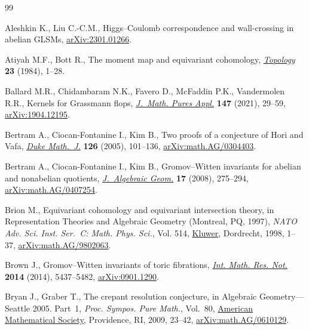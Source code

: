 \documentclass[pdftex]{sigma}
\numberwithin{equation}{section}
\begin{document}
\begin{thebibliography}{99}
\footnotesize\itemsep=0pt

Aleshkin K., Liu C.-C.M., {H}iggs--{C}oulomb correspondence and wall-crossing in
 abelian {GLSM}s, \href{https://arxiv.org/abs/2301.01266}{arXiv:2301.01266}.

Atiyah M.F., Bott R., The moment map and equivariant cohomology,
 \href{https://doi.org/10.1016/0040-9383(84)90021-1}{\textit{Topology}} \textbf{23} (1984), 1--28.

Ballard M.R., Chidambaram N.K., Favero D., McFaddin P.K., Vandermolen R.R.,
 Kernels for {G}rassmann flops, \href{https://doi.org/10.1016/j.matpur.2021.01.005}{\textit{J.~Math. Pures Appl.}} \textbf{147}
 (2021), 29--59, \href{https://arxiv.org/abs/1904.12195}{arXiv:1904.12195}.

Bertram A., Ciocan-Fontanine I., Kim B., Two proofs of a conjecture of {H}ori
 and {V}afa, \href{https://doi.org/10.1215/S0012-7094-04-12613-2}{\textit{Duke Math.~J.}} \textbf{126} (2005), 101--136,
 \href{https://arxiv.org/abs/math.AG/0304403}{arXiv:math.AG/0304403}.

Bertram A., Ciocan-Fontanine I., Kim B., Gromov--{W}itten invariants for
 abelian and nonabelian quotients, \href{https://doi.org/10.1090/S1056-3911-07-00456-0}{\textit{J.~Algebraic Geom.}} \textbf{17}
 (2008), 275--294, \href{https://arxiv.org/abs/math.AG/0407254}{arXiv:math.AG/0407254}.

Brion M., Equivariant cohomology and equivariant intersection theory, in
 Representation Theories and Algebraic Geometry ({M}ontreal, {PQ}, 1997),
 \textit{NATO Adv. Sci. Inst. Ser.~C: Math. Phys. Sci.}, Vol. 514, \href{https://doi.org/10.1007/978-94-015-9131-7_1}{Kluwer},
 Dordrecht, 1998, 1--37, \href{https://arxiv.org/abs/math.AG/9802063}{arXiv:math.AG/9802063}.

Brown J., Gromov--{W}itten invariants of toric fibrations, \href{https://doi.org/10.1093/imrn/rnt030}{\textit{Int. Math.
 Res. Not.}} \textbf{2014} (2014), 5437--5482, \href{https://arxiv.org/abs/0901.1290}{arXiv:0901.1290}.

Bryan J., Graber T., The crepant resolution conjecture, in Algebraic
 Geometry---{S}eattle 2005. {P}art~1, \textit{Proc. Sympos. Pure Math.},
 Vol.~80, \href{https://doi.org/10.1090/pspum/080.1/2483931}{American Mathematical Society}, Providence, RI, 2009, 23--42,
 \href{https://arxiv.org/abs/math.AG/0610129}{arXiv:math.AG/0610129}.


\end{thebibliography}
\end{document}
